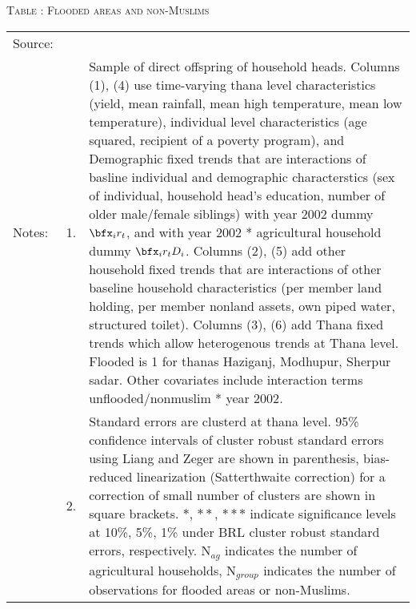 \begin{table}
\hfil\textsc{\footnotesize Table \thetable: Flooded areas and non-Muslims\label{FloodNonMuslimResults}}\\
\setlength{\tabcolsep}{1pt}
\renewcommand{\arraystretch}{.55}
\hfil

\renewcommand{\arraystretch}{1}
\hfil\begin{tabular}{>{\hfill\scriptsize}p{1cm}<{}>{\hfill\scriptsize}p{.5cm}<{}>{\scriptsize}p{12cm}<{\hfill}}
Source:& \multicolumn{2}{l}{\scriptsize Compiled from IFPRI data. }\\[-1ex]
Notes:& 1. & Sample of direct offspring of household heads. Columns \textsf{(1), (4)} use time-varying thana level characteristics (yield, mean rainfall, mean high temperature, mean low temperature), individual level characteristics (age squared, recipient of a poverty program), and \textsf{Demographic fixed trends} that are interactions of basline individual and demographic characterstics (sex of individual, household head's education, number of older male/female siblings) with year 2002 dummy $\bfx_{i}r_{t}$, and with year 2002 * agricultural household dummy $\bfx_{i}r_{t}D_{i}$. Columns \textsf{(2), (5)} add \textsf{other household fixed trends} that are interactions of other baseline household characteristics (per member land holding, per member nonland assets, own piped water, structured toilet). Columns \textsf{(3), (6)} add \textsf{Thana fixed trends} which allow heterogenous trends at Thana level.  \textsf{Flooded} is 1 for thanas Haziganj, Modhupur, Sherpur sadar. Other covariates include interaction terms \textsf{unflooded/nonmuslim * year 2002}. \\[-1ex]
& 2. & Standard errors are clusterd at thana level. 95\% confidence intervals of cluster robust standard errors using Liang and Zeger are shown in parenthesis, bias-reduced linearization (Satterthwaite correction) for a correction of small number of clusters are shown in square brackets. $*$, $**$, $***$ indicate significance levels at 10\%, 5\%, 1\% under BRL cluster robust standard errors, respectively. N$_{ag}$ indicates the number of agricultural households, N$_{group}$ indicates the number of observations for flooded areas or non-Muslims. 
\end{tabular}
\end{table}

